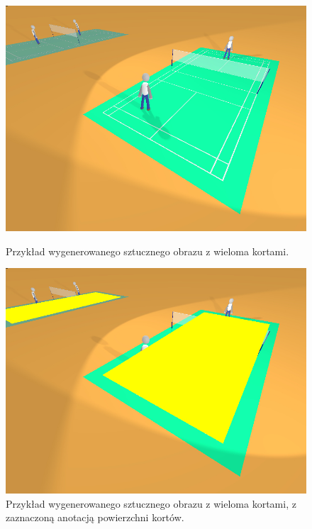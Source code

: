 \begin{figure}[!htb]
    \includegraphics[width=\linewidth]{./fakemultiple.jpg}
    \caption{Przykład wygenerowanego sztucznego obrazu z wieloma kortami.}
    \label{fig:fakemultiple}
  \endminipage\hfill
    \includegraphics[width=\linewidth]{./fakemultipleannotated.jpg}
    \caption{Przykład wygenerowanego sztucznego obrazu z wieloma kortami, z zaznaczoną anotacją powierzchni kortów.}
    \label{fig:fakemultipleannotated}
  \endminipage\hfill
\end{figure}
